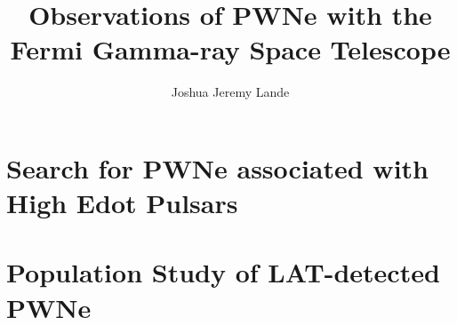 \documentclass[12pt]{report}
\title{Observations of PWNe with the Fermi Gamma-ray Space Telescope}
\author{Joshua Jeremy Lande}
\begin{document}
 


\beforepreface


\afterpreface














\chapter{Search for PWNe associated with High Edot Pulsars}

\chapter{Population Study of LAT-detected PWNe}


\appendix

%
%
%





\end{document}
